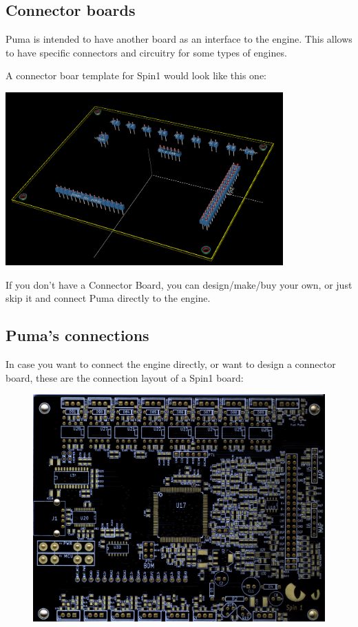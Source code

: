 \documentclass[12pt,a4paper,titlepage]{article}
\begin{document}
\subsection{Connector boards}
Puma is intended to have another board as an interface to the engine. This allows to have specific connectors and circuitry for some types of engines.

A connector boar template for Spin1 would look like this one:
\begin{center}
\includegraphics[width=0.8\textwidth]{images/connector_board3D.png}
\end{center}

If you don't have a Connector Board, you can design/make/buy your own, or just skip it and connect Puma directly to the engine.

\subsection{Puma's connections} %

In case you want to connect the engine directly, or want to design a connector board, these are the connection layout of a Spin1 board:


\begin{figure}[h!]
\begin{center}
\includegraphics[width=1\textwidth]{images/Spin1_front.png}
\label{fig:Spin1_front}
\end{center}
\end{figure}
\end{document}
